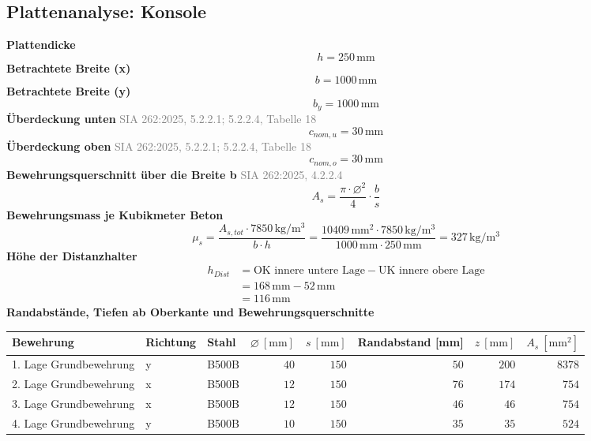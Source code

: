 \documentclass[11pt,a4paper]{article}
\newcommand{\normref}[1]{{\small\textcolor{gray}{#1}}}
\begin{document}
\subsection{Plattenanalyse: Konsole}
\noindent\textbf{Plattendicke}
\begin{equation*}
h = 250\,\mathrm{mm}
\end{equation*}
\noindent\textbf{Betrachtete Breite (x)}
\begin{equation*}
b = 1000\,\mathrm{mm}
\end{equation*}
\noindent\textbf{Betrachtete Breite (y)}
\begin{equation*}
b_y = 1000\,\mathrm{mm}
\end{equation*}
\noindent\textbf{Überdeckung unten} \hfill \normref{SIA 262:2025, 5.2.2.1; 5.2.2.4, Tabelle 18}
\begin{equation*}
c_{nom,u} = 30\,\mathrm{mm}
\end{equation*}
\noindent\textbf{Überdeckung oben} \hfill \normref{SIA 262:2025, 5.2.2.1; 5.2.2.4, Tabelle 18}
\begin{equation*}
c_{nom,o} = 30\,\mathrm{mm}
\end{equation*}
\noindent\textbf{Bewehrungsquerschnitt über die Breite b} \hfill \normref{SIA 262:2025, 4.2.2.4}
\begin{equation*}
A_s = \frac{\pi \cdot \varnothing^{2}}{4} \cdot \frac{b}{s}
\end{equation*}
\noindent\textbf{Bewehrungsmass je Kubikmeter Beton}
\begin{equation*}
\mu_s = \frac{A_{s,tot} \cdot 7850\,\mathrm{kg}/\mathrm{m}^{3}}{b \cdot h} = \frac{10409\,\mathrm{mm}^{2} \cdot 7850\,\mathrm{kg}/\mathrm{m}^{3}}{1000\,\mathrm{mm} \cdot 250\,\mathrm{mm}} = 327\,\mathrm{kg}/\mathrm{m}^{3}
\end{equation*}
\noindent\textbf{Höhe der Distanzhalter}
\begin{equation*}
\begin{aligned}
  h_{Dist} &= \text{OK innere untere Lage} - \text{UK innere obere Lage} \\
  &= 168\,\mathrm{mm} - 52\,\mathrm{mm} \\
  &= 116\,\mathrm{mm}
\end{aligned}
\end{equation*}
\noindent\textbf{Randabstände, Tiefen ab Oberkante und Bewehrungsquerschnitte}
\begin{longtable}{lllrrrrr}
\hline
Bewehrung & Richtung & Stahl & $\varnothing\ [\mathrm{mm}]$ & $s\ [\mathrm{mm}]$ & Randabstand [mm] & $z\ [\mathrm{mm}]$ & $A_s\ [\mathrm{mm}^2]$ \\
\hline
\endhead
1. Lage Grundbewehrung & y & B500B & $40$ & $150$ & $50$ & $200$ & $8378$ \\
2. Lage Grundbewehrung & x & B500B & $12$ & $150$ & $76$ & $174$ & $754$ \\
3. Lage Grundbewehrung & x & B500B & $12$ & $150$ & $46$ & $46$ & $754$ \\
4. Lage Grundbewehrung & y & B500B & $10$ & $150$ & $35$ & $35$ & $524$ \\
\hline
\end{longtable}
\end{document}
